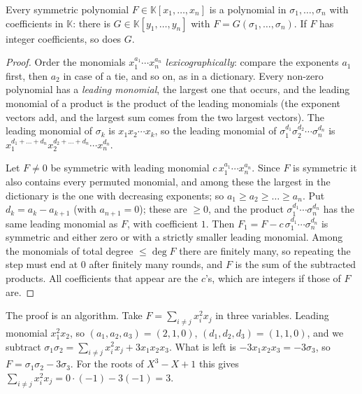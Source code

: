 \begin{theorem}\label{thm:symmetric}
Every symmetric polynomial $F\in\mathbb K[x_1,\dots,x_n]$ is a polynomial in $\sigma_1,\dots,\sigma_n$ with coefficients in $\mathbb K$: there is
$G\in\mathbb K[y_1,\dots,y_n]$ with $F=G(\sigma_1,\dots,\sigma_n)$. If $F$ has integer coefficients, so does $G$.
\end{theorem}
\begin{proof}
Order the monomials $x_1^{a_1}\cdots x_n^{a_n}$ \emph{lexicographically}: compare the exponents $a_1$ first, then $a_2$ in case of a tie, and so on,
as in a dictionary. Every non-zero polynomial has a \emph{leading monomial}, the largest one that occurs, and the leading monomial of a product is
the product of the leading monomials (the exponent vectors add, and the largest sum comes from the two largest vectors). The leading monomial of
$\sigma_k$ is $x_1x_2\cdots x_k$, so the leading monomial of $\sigma_1^{d_1}\sigma_2^{d_2}\cdots\sigma_n^{d_n}$ is
$x_1^{d_1+\dots+d_n}x_2^{d_2+\dots+d_n}\cdots x_n^{d_n}$.

Let $F\ne0$ be symmetric with leading monomial $c\,x_1^{a_1}\cdots x_n^{a_n}$. Since $F$ is symmetric it also contains every permuted monomial, and
among these the largest in the dictionary is the one with decreasing exponents; so $a_1\ge a_2\ge\dots\ge a_n$. Put $d_k=a_k-a_{k+1}$ (with
$a_{n+1}=0$); these are $\ge0$, and the product $\sigma_1^{d_1}\cdots\sigma_n^{d_n}$ has the same leading monomial as $F$, with coefficient $1$. Then
$F_1=F-c\,\sigma_1^{d_1}\cdots\sigma_n^{d_n}$ is symmetric and either zero or with a strictly smaller leading monomial. Among the monomials of total
degree $\le\deg F$ there are finitely many, so repeating the step must end at $0$ after finitely many rounds, and $F$ is the sum of the
subtracted products. All coefficients that appear are the $c$'s, which are integers if those of $F$ are.
\end{proof}

\begin{examplex}
The proof is an algorithm. Take $F=\sum_{i\ne j}x_i^2x_j$ in three variables. Leading monomial $x_1^2x_2$, so $(a_1,a_2,a_3)=(2,1,0)$,
$(d_1,d_2,d_3)=(1,1,0)$, and we subtract $\sigma_1\sigma_2=\sum_{i\ne j}x_i^2x_j+3x_1x_2x_3$. What is left is $-3x_1x_2x_3=-3\sigma_3$, so
$F=\sigma_1\sigma_2-3\sigma_3$. For the roots of $X^3-X+1$ this gives $\sum_{i\ne j}x_i^2x_j=0\cdot(-1)-3(-1)=3$.
\end{examplex}

